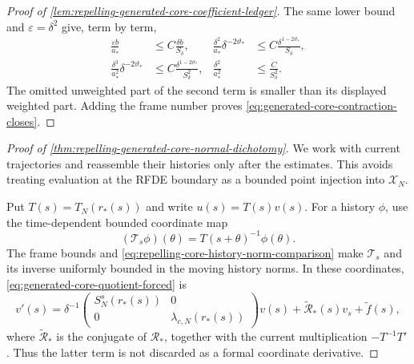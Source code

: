 \begin{proof}[Proof of
\cref{lem:repelling-generated-core-coefficient-ledger}]
The same lower bound and \(\varepsilon=\delta^2\) give, term by term,
\begin{align*}
 \frac{\varepsilon b}{a_*}
 &\le C\frac{\delta b}{S_\delta},&
 \frac{\delta^2}{a_*}\delta^{-2\vartheta_*}
 &\le C\frac{\delta^{1-2\vartheta_*}}{S_\delta},\\
 \frac{\delta^3}{a_*^2}\delta^{-2\vartheta_*}
 &\le C\frac{\delta^{1-2\vartheta_*}}{S_\delta^2},&
 \frac{\delta^2}{a_*^2}
 &\le\frac{C}{S_\delta^2}.
\end{align*}
The omitted unweighted part of the second term is smaller than its
displayed weighted part.  Adding the frame number proves
\cref{eq:generated-core-contraction-closes}.
\end{proof}

\begin{proof}[Proof of
\cref{thm:repelling-generated-core-normal-dichotomy}]
We work with current trajectories and reassemble their histories only
after the estimates.  This avoids treating evaluation at the RFDE
boundary as a bounded point injection into \(\mathscr X_N\).

Put \(T(s)=T_N(r_*(s))\) and write \(u(s)=T(s)v(s)\).  For a history
\(\phi\), use the time-dependent bounded coordinate map
\[
 (\mathcal T_s\phi)(\theta)
 =T(s+\theta)^{-1}\phi(\theta).
\]
The frame bounds and
\cref{eq:repelling-core-history-norm-comparison} make
\(\mathcal T_s\) and its inverse uniformly bounded in the moving history
norms.  In these coordinates,
\cref{eq:generated-core-quotient-forced} is
\begin{equation}
 v'(s)=\delta^{-1}
 \begin{pmatrix}S_N^s(r_*(s))&0\\0&\lambda_{c,N}(r_*(s))\end{pmatrix}v(s)
 +\widetilde{\mathcal R}_*(s)v_s+\widetilde f(s),            \label{eq:proof-generated-core-frame-equation}
\end{equation}
where \(\widetilde{\mathcal R}_*\) is the conjugate of
\(\mathcal R_*\), together with the current multiplication
\(-T^{-1}T'\).  Thus the latter term is not discarded as a formal
coordinate derivative.


\end{proof}
